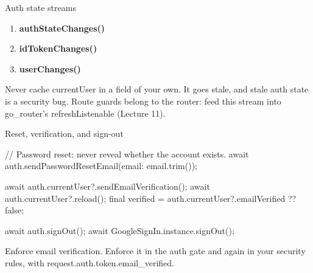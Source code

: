 \documentclass[10pt,aspectratio=169,t]{beamer}
\begin{document}
\begin{frame}[eyebrow=Firebase Auth]{Auth state streams}
  \vskip 2mm
  \begin{enumerate}
    \item \textbf{authStateChanges()} 
    \item \textbf{idTokenChanges()} 
    \item \textbf{userChanges()} 
  \end{enumerate}
  \begin{takeaway}{Never cache currentUser in a field of your own.}
    It goes stale, and stale auth state is a security bug. Route guards belong to the router: feed this stream into go\_router's refreshListenable (Lecture 11).
  \end{takeaway}
\end{frame}

\begin{frame}[fragile,eyebrow=Firebase Auth]{Reset, verification, and sign-out}
\begin{dart}
// Password reset: never reveal whether the account exists.
await auth.sendPasswordResetEmail(email: email.trim());

await auth.currentUser?.sendEmailVerification();
await auth.currentUser?.reload();
final verified = auth.currentUser?.emailVerified ?? false;

await auth.signOut();
await GoogleSignIn.instance.signOut();
\end{dart}
  \begin{takeaway}{Enforce email verification.}
    Enforce it in the auth gate and again in your security rules, with request.auth.token.email\_verified.
  \end{takeaway}
\end{frame}
\end{document}
